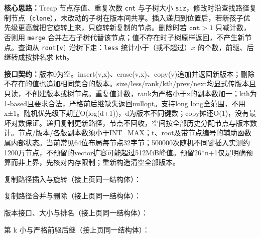 \textbf{核心思路：}\allowbreak Treap 节点存值、重复次数 \texttt{cnt} 与子树大小 \texttt{siz}，修改时沿查找路径复制节点（\texttt{clone}），未改动的子树在版本间共享。插入递归到位置后，若新孩子优先级更高就把它旋转上来，只旋转新复制的节点。删除时若 $\texttt{cnt}>1$ 只减计数，否则用 \texttt{merge} 合并左右子树代替该节点；值不存在时子树原样返回，不产生新节点。查询从 \texttt{root[v]} 沿树下走：\texttt{less} 统计小于（或不超过）$x$ 的个数，前驱、后继转成按排名求 \texttt{kth}。



{\sloppy{}\noindent\textbf{接口契约：}版本0为空。insert(v,x)、erase(v,x)、copy(v)追加并返回新版本；删除不存在的值也追加相同集合的版本。size/less/rank/kth/prev/next均显式传版本且只读，不创建版本或树节点。重复值计数，rank为严格小于x的副本数加一；kth为1-based且要求合法，严格前后继缺失返回nullopt。支持long long全范围，不用x±1。随机优先级下期望O(log(d+1))，d为版本不同键数；copy摊还O(1)，没有最坏对数保证。递归复制更新路径，节点不回收，空间按全部历史分配节点与版本数计。节点/版本/各版副本数须小于INT\_MAX；t、root及带节点编号的辅助函数属内部状态。当前常见64位布局每节点32字节；500000次随机不同键插入实测约1200万节点，不预留的vector扩容可能超过512MiB峰值。预留26*n+1仅是明确预算而非上界，先核对内存限制；重新构造清空全部版本。\par}

\Needspace{400pt}



\newpage

\noindent 复制路径插入与旋转（接上页同一结构体）：



\newpage

\noindent 复制路径合并与删除（接上页同一结构体）：



\newpage

\noindent 版本接口、大小与排名（接上页同一结构体）：



\newpage

\noindent 第 k 小与严格前驱后继（接上页同一结构体）：



